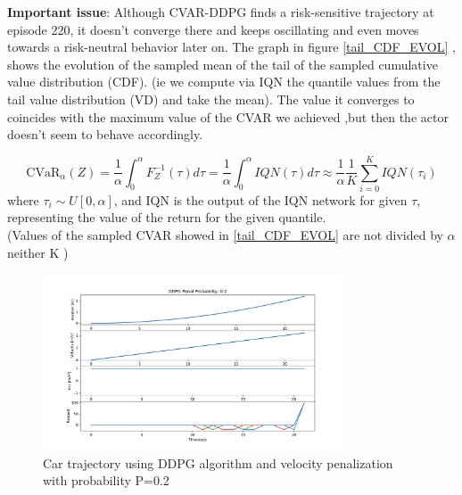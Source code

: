 \textbf{Important issue}: Although CVAR-DDPG finds a risk-sensitive trajectory at
episode 220, it doesn't converge there and keeps oscillating and even moves towards a
risk-neutral behavior later on.
The graph in figure \ref{tail_CDF_EVOL} , shows the evolution of the sampled mean of the
tail of the sampled cumulative value distribution (CDF). (ie we compute via IQN the
quantile values from the tail value distribution (VD) and take the mean).
The value it converges to coincides with the maximum value of the CVAR we achieved ,but
then the actor doesn't seem to behave accordingly.


\begin{equation}
        \text{CVaR}_\alpha (Z) = \frac{1}{\alpha} \int_{0}^{\alpha} F^{-1}_Z(\tau) d\tau=\frac{1}{\alpha} \int_{0}^{\alpha} IQN(\tau) d\tau \approx 
        \frac{1}{\alpha} \frac{1}{K}\sum_{i=0}^K IQN(\tau_i) 
\end{equation}
where $\tau_i \sim U[0,\alpha]$, and IQN is the output of the IQN network for given $\tau$, representing the
value of the return for the given quantile.\\
(Values of the sampled CVAR showed in \ref{tail_CDF_EVOL} are not divided by $\alpha$ neither K )
\begin{figure}[ht]
        \centering
        \includegraphics[width=0.8\textwidth]{images/Car/DDPG/Trajectory_DDPG_ppenal02.pdf}
        \caption{Car trajectory using DDPG algorithm and velocity penalization with
        probability P=0.2}
        \label{traj_ddpg_probpenal0.2}
    
\end{figure}

